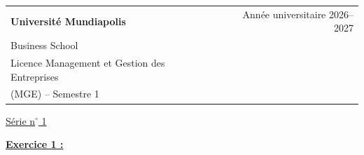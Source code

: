 \documentclass[11pt,a4paper]{article}
\begin{document}
\noindent
\begin{tabularx}{\textwidth}{@{}X r@{}}
\textbf{Université Mundiapolis} & Année universitaire 2026--2027 \\
Business School & \\
Licence Management et Gestion des Entreprises & \\
(MGE) -- Semestre 1 &
\end{tabularx}

\begin{center}
\underline{Série n$^\circ$ 1}
\end{center}

\textbf{\underline{Exercice 1 :}}
\end{document}
